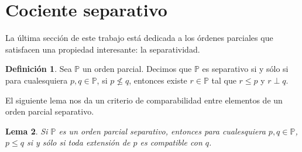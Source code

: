 \documentclass[11pt]{unam_tesis1}
\theoremstyle{MyThmStyle}
\theoremstyle{definition}
\newtheorem{definition}{Definici\'on}[chapter]
\theoremstyle{plain}
\newtheorem{lemma}[definition]{Lema}
\theoremstyle{remark}
\def\dom{\mathop{\rm dom}\nolimits}
\def\rest{\mathop{\upharpoonright}\nolimits}
\let\leq\leqslant
\begin{document}









\section{Cociente separativo}

La \'ultima secci\'on de este trabajo est\'a dedicada a los \'ordenes parciales que satisfacen una propiedad interesante: la separatividad.

\begin{definition}
Sea $\mathbb P$ un orden parcial. Decimos que $\mathbb P$ es separativo si y s\'olo si para cualesquiera $p,q \in \mathbb P$, si $p\nleq q$, entonces existe $r\in \mathbb P$ tal que $r\leq p$ y $r\perp q$.
\end{definition}

El siguiente lema nos da un criterio de comparabilidad entre elementos de un orden parcial separativo.

\begin{lemma}\label{comparabilidadseparativa}
Si $\mathbb P$ es un orden parcial separativo, entonces para cualesquiera $p,q\in \mathbb P$, $p\leq q$ si y s\'olo si  toda extensi\'on de $p$ es compatible con $q$.
\end{lemma}
\end{document}
